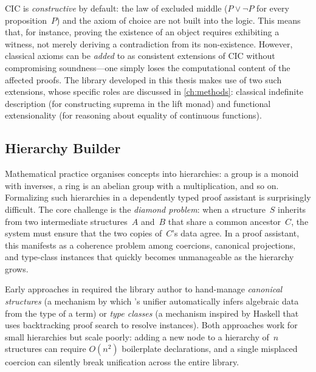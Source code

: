 CIC is \emph{constructive} by default: the law of excluded middle
($P \lor \lnot P$ for every proposition~$P$) and the axiom of choice are
not built into the logic.  This means that, for instance, proving the
existence of an object requires exhibiting a witness, not merely deriving
a contradiction from its non-existence.  However, classical axioms can be
\emph{added} to \Rocq{} as consistent extensions of CIC without
compromising soundness---one simply loses the computational content of
the affected proofs.  The library developed in this thesis makes use of
two such extensions, whose specific roles are discussed in
\cref{ch:methods}: classical indefinite description (for constructing
suprema in the lift monad) and functional extensionality (for reasoning
about equality of continuous functions).

\subsection{Hierarchy Builder}
\label{sec:bg-hb}

Mathematical practice organises concepts into hierarchies: a group is a
monoid with inverses, a ring is an abelian group with a multiplication,
and so on.  Formalizing such hierarchies in a dependently typed proof
assistant is surprisingly difficult.  The core challenge is the
\emph{diamond problem}: when a structure~$S$ inherits from two
intermediate structures~$A$ and~$B$ that share a common
ancestor~$C$, the system must ensure that the two copies of~$C$'s data
agree.  In a proof assistant, this manifests as a coherence problem among
coercions, canonical projections, and type-class instances that quickly
becomes unmanageable as the hierarchy grows.

Early approaches in \Rocq{} required the library author to hand-manage
\emph{canonical structures} (a mechanism by which \Rocq{}'s unifier
automatically infers algebraic data from the type of a term) or
\emph{type classes} (a mechanism inspired by Haskell that uses
backtracking proof search to resolve instances).  Both approaches work
for small hierarchies but scale poorly: adding a new node to a hierarchy
of~$n$ structures can require $O(n^2)$ boilerplate declarations, and a
single misplaced coercion can silently break unification across the
entire library.


